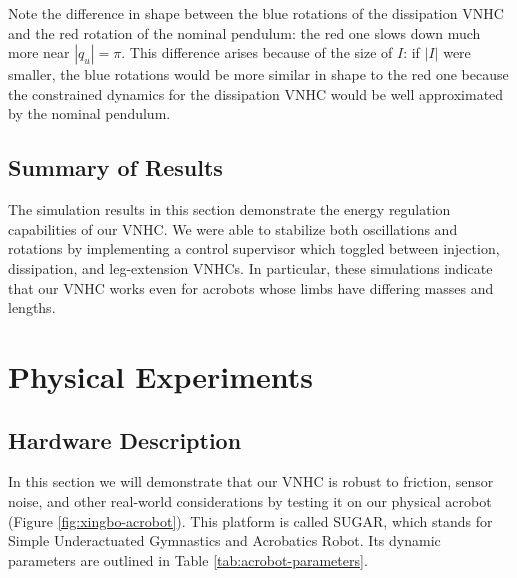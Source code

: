\documentclass[journal,twoside,web, onecolumn, draftcls]{ieeecolor}
\begin{document}
Note the difference in shape between the blue rotations of the dissipation VNHC
and the red rotation of the nominal pendulum: the red one slows down much more
near \(|q_u| = \pi\).
This difference arises because of the size of \(I\):
if \(|I|\) were smaller, the blue rotations would be more similar in shape to the
red one because the constrained dynamics for the dissipation VNHC would be
well approximated by the nominal pendulum.

\subsection{Summary of Results}
The simulation results in this section demonstrate the energy regulation
capabilities of our VNHC.  
We were able to stabilize both oscillations and rotations by implementing a
control supervisor which toggled between injection, dissipation, and
leg-extension VNHCs.
In particular, these simulations indicate that our VNHC
works even for acrobots whose limbs have differing masses and lengths.

\section{Physical Experiments}\label{sec:experiments}

\subsection{Hardware Description}
In this section we will demonstrate that our VNHC is robust to friction, sensor
noise, and other real-world considerations by testing it on our physical
acrobot (Figure \ref{fig:xingbo-acrobot}).
This platform is called SUGAR, which stands for
Simple Underactuated Gymnastics and Acrobatics Robot.
Its dynamic parameters are outlined in Table \ref{tab:acrobot-parameters}.
\end{document}
